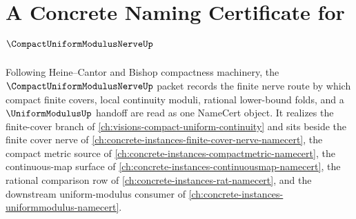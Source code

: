 \chapter{A Concrete Naming Certificate for $\CompactUniformModulusNerveUp$}
\label{ch:concrete-instances-compact-uniform-modulus-nerve-namecert}

Following Heine--Cantor and Bishop compactness machinery, the $\CompactUniformModulusNerveUp$ packet records the finite nerve route by which compact finite covers, local continuity moduli, rational lower-bound folds, and a $\UniformModulusUp$ handoff are read as one NameCert object. It realizes the finite-cover branch of \autoref{ch:visions-compact-uniform-continuity} and sits beside the finite cover nerve of \autoref{ch:concrete-instances-finite-cover-nerve-namecert}, the compact metric source of \autoref{ch:concrete-instances-compactmetric-namecert}, the continuous-map surface of \autoref{ch:concrete-instances-continuousmap-namecert}, the rational comparison row of \autoref{ch:concrete-instances-rat-namecert}, and the downstream uniform-modulus consumer of \autoref{ch:concrete-instances-uniformmodulus-namecert}.

